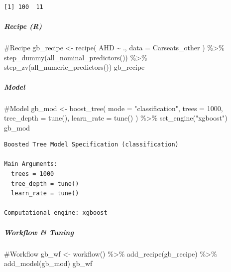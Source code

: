 \documentclass[
]{article}
\let\oldsubparagraph\subparagraph
\renewcommand{\subparagraph}[1]{\oldsubparagraph{#1}\mbox{}}
\newenvironment{Shaded}{\begin{snugshade}}{\end{snugshade}}
\newcommand{\AttributeTok}[1]{\textcolor[rgb]{0.40,0.45,0.13}{#1}}
\newcommand{\CommentTok}[1]{\textcolor[rgb]{0.37,0.37,0.37}{#1}}
\newcommand{\DecValTok}[1]{\textcolor[rgb]{0.68,0.00,0.00}{#1}}
\newcommand{\FunctionTok}[1]{\textcolor[rgb]{0.28,0.35,0.67}{#1}}
\newcommand{\NormalTok}[1]{\textcolor[rgb]{0.00,0.23,0.31}{#1}}
\newcommand{\OtherTok}[1]{\textcolor[rgb]{0.00,0.23,0.31}{#1}}
\newcommand{\SpecialCharTok}[1]{\textcolor[rgb]{0.37,0.37,0.37}{#1}}
\newcommand{\StringTok}[1]{\textcolor[rgb]{0.13,0.47,0.30}{#1}}
\begin{document}
\begin{verbatim}
[1] 100  11
\end{verbatim}

\hypertarget{recipe-r-3}{%
\subparagraph{Recipe (R)}\label{recipe-r-3}}

\begin{Shaded}
\begin{Highlighting}[]
\CommentTok{\#Recipe}
\NormalTok{gb\_recipe }\OtherTok{\textless{}{-}} 
  \FunctionTok{recipe}\NormalTok{(}
\NormalTok{    AHD }\SpecialCharTok{\textasciitilde{}}\NormalTok{ ., }
    \AttributeTok{data =}\NormalTok{ Carseats\_other}
\NormalTok{  ) }\SpecialCharTok{\%\textgreater{}\%}
  \FunctionTok{step\_dummy}\NormalTok{(}\FunctionTok{all\_nominal\_predictors}\NormalTok{()) }\SpecialCharTok{\%\textgreater{}\%}
  \FunctionTok{step\_zv}\NormalTok{(}\FunctionTok{all\_numeric\_predictors}\NormalTok{())}
\NormalTok{gb\_recipe}
\end{Highlighting}
\end{Shaded}

\hypertarget{model-3}{%
\subparagraph{Model}\label{model-3}}

\begin{Shaded}
\begin{Highlighting}[]
\CommentTok{\#Model}
\NormalTok{gb\_mod }\OtherTok{\textless{}{-}} 
  \FunctionTok{boost\_tree}\NormalTok{(}
    \AttributeTok{mode =} \StringTok{"classification"}\NormalTok{,}
    \AttributeTok{trees =} \DecValTok{1000}\NormalTok{, }
    \AttributeTok{tree\_depth =} \FunctionTok{tune}\NormalTok{(),}
    \AttributeTok{learn\_rate =} \FunctionTok{tune}\NormalTok{()}
\NormalTok{  ) }\SpecialCharTok{\%\textgreater{}\%} 
  \FunctionTok{set\_engine}\NormalTok{(}\StringTok{"xgboost"}\NormalTok{)}
\NormalTok{gb\_mod}
\end{Highlighting}
\end{Shaded}

\begin{verbatim}
Boosted Tree Model Specification (classification)

Main Arguments:
  trees = 1000
  tree_depth = tune()
  learn_rate = tune()

Computational engine: xgboost 
\end{verbatim}

\hypertarget{workflow-tuning-1}{%
\subparagraph{Workflow \& Tuning}\label{workflow-tuning-1}}

\begin{Shaded}
\begin{Highlighting}[]
\CommentTok{\#Workflow}
\NormalTok{gb\_wf }\OtherTok{\textless{}{-}} \FunctionTok{workflow}\NormalTok{() }\SpecialCharTok{\%\textgreater{}\%}
  \FunctionTok{add\_recipe}\NormalTok{(gb\_recipe) }\SpecialCharTok{\%\textgreater{}\%}
  \FunctionTok{add\_model}\NormalTok{(gb\_mod)}
\NormalTok{gb\_wf}
\end{Highlighting}
\end{Shaded}
\end{document}
